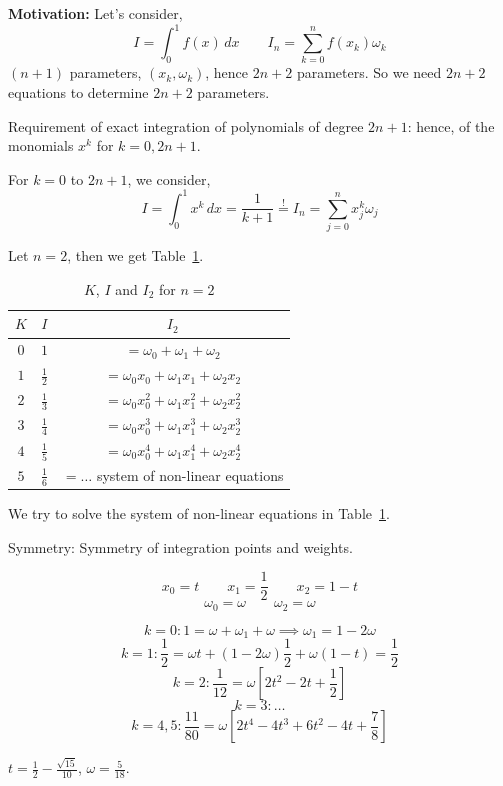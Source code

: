 \documentclass{article}
\begin{document}
\textbf{Motivation:}
Let's consider,
\[ I = \int_0^1 f(x) \, dx \qquad I_n = \sum_{k=0}^n f(x_k) \omega_k \]
$(n+1)$ parameters, $(x_k, \omega_k)$, hence $2n+2$ parameters.
So we need $2n+2$ equations to determine $2n+2$ parameters.

Requirement of exact integration of polynomials of degree $2n+1$: hence, of the monomials $x^k$ for $k=0,2n+1$.

For $k=0$ to $2n+1$, we consider,
\[ I = \int_0^1 x^k \, dx = \frac{1}{k+1} \stackrel{!}{=} I_n = \sum_{j=0}^n x_j^k \omega_j \]

Let $n=2$, then we get Table~\ref{tab:snle}.
\begin{table}[!h]
  \begin{center}
    \begin{tabular}{ccc}
      $K$ & $I$ & $I_2$ \\
    \hline
      $0$ & $1$ & $= \omega_0 + \omega_1 + \omega_2$ \\
      $1$ & $\frac12$ & $= \omega_0 x_0 + \omega_1 x_1 + \omega_2 x_2$ \\
      $2$ & $\frac13$ & $= \omega_0 x_0^2 + \omega_1 x_1^2 + \omega_2 x_2^2$ \\
      $3$ & $\frac14$ & $= \omega_0 x_0^3 + \omega_1 x_1^3 + \omega_2 x_2^3$ \\
      $4$ & $\frac15$ & $= \omega_0 x_0^4 + \omega_1 x_1^4 + \omega_2 x_2^4$ \\
      $5$ & $\frac16$ & $= \ldots$ system of non-linear equations
    \end{tabular}
    \caption{$K$, $I$ and $I_2$ for $n=2$}
    \label{tab:snle}
  \end{center}
\end{table}

We try to solve the system of non-linear equations in Table~\ref{tab:snle}.

Symmetry: Symmetry of integration points and weights.

\[ x_0 = t \qquad x_1 = \frac12 \qquad x_2 = 1 - t \]
\[ \omega_0 = \omega \qquad \omega_2 = \omega \]

\[ k=0: 1 = \omega + \omega_1 + \omega \implies \omega_1 = 1 - 2\omega \]
\[ k=1: \frac12 = \omega t + (1 - 2\omega) \frac12 + \omega(1 - t) = \frac12 \]
\[ k=2: \frac1{12} = \omega [2t^2 - 2t + \frac12] \]
\[ k=3: \ldots \]
\[ k=4,5: \frac{11}{80} = \omega\left[2t^4 - 4t^3 + 6t^2 - 4t + \frac78\right] \]

$t = \frac12 - \frac{\sqrt{15}}{10}$, $\omega = \frac{5}{18}$.
\end{document}
